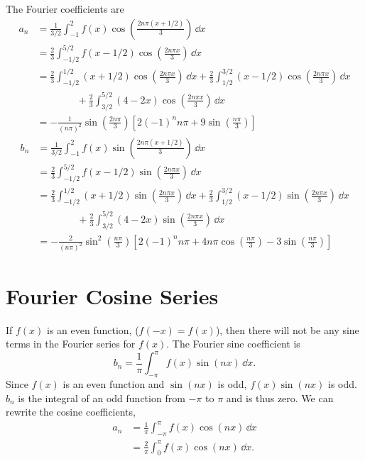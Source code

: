 \begin{Example}
  The Fourier coefficients are
  \begin{align*}
    a_n &= \frac{1}{3/2} \int_{-1}^2 f(x) \cos \left( \frac{2 n \pi (x+1/2)}{3}
    \right)\,\dd x \\
    &= \frac{2}{3} \int_{-1/2}^{5/2} f(x-1/2) \cos \left(
      \frac{2 n \pi x}{3} \right)\,\dd x \\
    &= \frac{2}{3} \int_{-1/2}^{1/2} (x + 1/2) \cos \left(
      \frac{2 n \pi x}{3} \right)\,\dd x 
    + \frac{2}{3} \int_{1/2}^{3/2} (x - 1/2) \cos \left(
      \frac{2 n \pi x}{3} \right)\,\dd x \\
    &\qquad \qquad+ \frac{2}{3} \int_{3/2}^{5/2} (4 - 2x) \cos \left(
      \frac{2 n \pi x}{3} \right)\,\dd x \\
    &= -\frac{1}{(n\pi)^2}\sin\left( \frac{2n\pi}{3} \right)
    \left[ 2 (-1)^n n \pi + 
      9 \sin\left(\frac{n\pi}{3}\right) \right] 
  \end{align*}
  \begin{align*}
    b_n     &= \frac{1}{3/2} \int_{-1}^2 f(x) \sin \left( \frac{2 n \pi (x+1/2)}{3}
    \right)\,\dd x \\
    &= \frac{2}{3} \int_{-1/2}^{5/2} f(x-1/2) \sin \left(
      \frac{2 n \pi x}{3} \right)\,\dd x \\
    &= \frac{2}{3} \int_{-1/2}^{1/2} (x + 1/2) \sin \left(
      \frac{2 n \pi x}{3} \right)\,\dd x 
    + \frac{2}{3} \int_{1/2}^{3/2} (x - 1/2) \sin \left(
      \frac{2 n \pi x}{3} \right)\,\dd x \\
    &\qquad \qquad + \frac{2}{3} \int_{3/2}^{5/2} (4 - 2x) \sin \left(
      \frac{2 n \pi x}{3} \right)\,\dd x \\
    &= -\frac{2}{(n\pi)^2} \sin^2\left( \frac{n\pi}{3} \right)
    \left[ 2 (-1)^n n \pi + 4 n \pi \cos\left(\frac{n\pi}{3}
      \right) - 3 \sin\left(\frac{n\pi}{3}\right) \right]
  \end{align*}


\end{Example}




\section{Fourier Cosine Series}

If $f(x)$ is an even function, ($f(-x) = f(x)$), then there will not be 
any sine terms in the Fourier series for $f(x)$.  The Fourier sine 
coefficient is 
\[ b_n = \frac{1}{\pi} \int_{-\pi}^\pi f(x) \sin(n x)\,\dd x.\]
Since $f(x)$ is an even function and $\sin(n x)$ is odd, $f(x) \sin(n x)$ 
is odd.  $b_n$ is the integral of an odd function from $-\pi$ to $\pi$
and is thus zero.  We can rewrite the cosine coefficients,
\begin{align*}
  a_n     &= \frac{1}{\pi} \int_{-\pi}^\pi f(x) \cos(n x)\,\dd x \\
  &= \frac{2}{\pi} \int_0^\pi f(x) \cos(n x)\,\dd x.
\end{align*}





